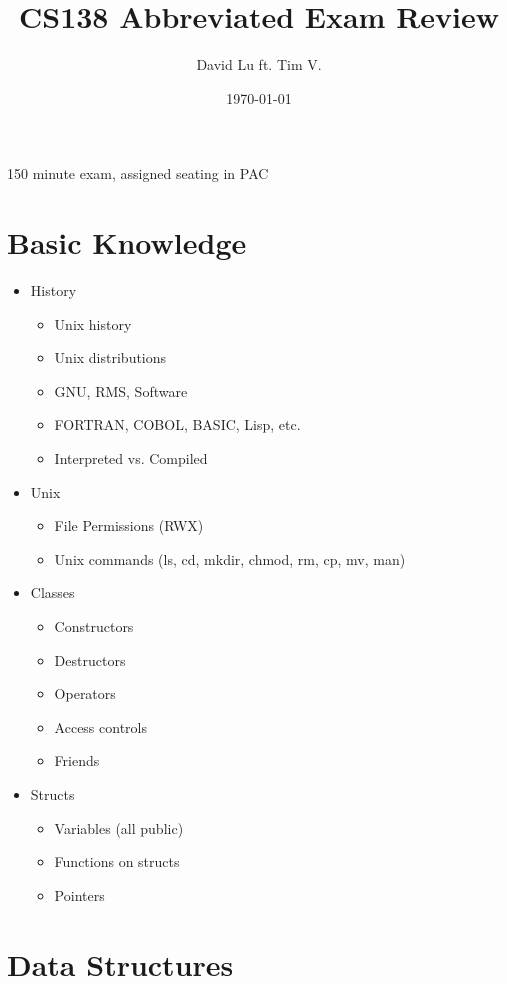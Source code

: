 \documentclass{article}
\begin{document}
\title{CS138 Abbreviated Exam Review}
\date{\today}
\author{David Lu ft. Tim V.}

\maketitle

150 minute exam, assigned seating in PAC

\begin{multicols}{2}
\section{Basic Knowledge}

\begin{itemize}
	\item{History}
	\begin{itemize}
		\item{Unix history}
		\item{Unix distributions}
		\item{GNU, RMS, Software}
		\item{FORTRAN, COBOL, BASIC, Lisp, etc.}
		\item{Interpreted vs. Compiled}
	\end{itemize}
	\item{Unix}
	\begin{itemize}
		\item{File Permissions (RWX)}
		\item{Unix commands (ls, cd, mkdir, chmod, rm, cp, mv, man)}
	\end{itemize}
	\item{Classes}
	\begin{itemize}
		\item{Constructors}
		\item{Destructors}
		\item{Operators}
		\item{Access controls}
		\item{Friends}
	\end{itemize}
	\item{Structs}
	\begin{itemize}
		\item{Variables (all public)}
		\item{Functions on structs}
		\item{Pointers}
	\end{itemize}
\end{itemize}

\section{Data Structures}


\end{multicols}
\end{document}
